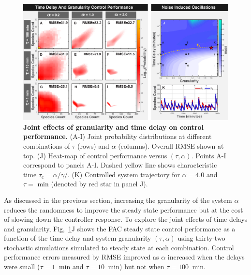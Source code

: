 \documentclass[12pt]{iopart}
\begin{document}
\begin{figure}
\begin{center}
\includegraphics[width=1\textwidth]{DelayAndGranularity.pdf}
\vspace{-0.1in}
\caption{{\bf Joint effects of granularity and time delay on control performance.} (A-I) Joint probability distributions at different combinations of $\tau$ (rows) and $\alpha$ (columns). Overall RMSE shown at top. (J) Heat-map of control performance versus $(\tau,\alpha)$. Points A-I correspond to panels A-I. Dashed yellow line shows characteristic time $\tau_c = \alpha/\gamma/$.
 
(K) Controlled system trajectory for $\alpha = 4.0$ and $\tau = $ min (denoted by red star in panel J).}
\label{DG}
\end{center}
\vspace{-0.2in}
\end{figure}

As discussed in the previous section, increasing the granularity of the system $\alpha$ reduces the randomness to improve the steady state performance but at the cost of slowing down the controller response.  To explore the joint effects of time delays and granularity, Fig,\ \ref{DG}J shows the FAC steady state control performance as a function of the time delay and system granularity $(\tau,\alpha)$ using thirty-two stochastic simulations simulated to steady state at each combination. Control performance errors measured by RMSE improved as $\alpha$ increased when the delays were small ($\tau=1 \ $ min and $\tau=10 \ $ min) but not when $\tau=100 \ $ min. 
%
\end{document}
